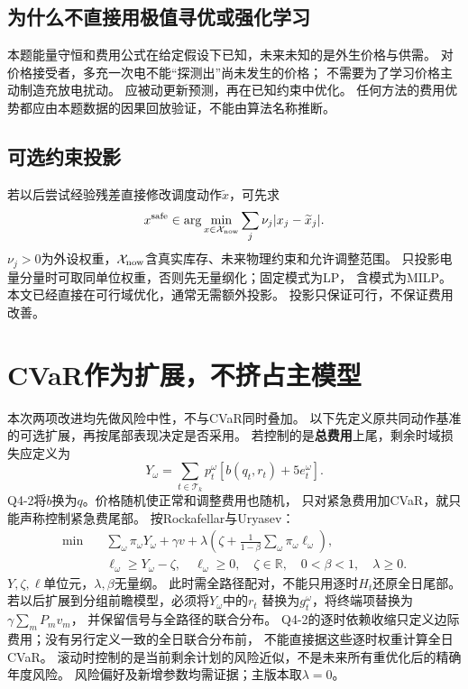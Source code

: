 \documentclass[UTF8,11pt]{ctexart}
\newcommand{\R}{\mathbb R}
\begin{document}
\subsection{为什么不直接用极值寻优或强化学习}
本题能量守恒和费用公式在给定假设下已知，未来未知的是外生价格与供需。
对价格接受者，多充一次电不能“探测出”尚未发生的价格；
不需要为了学习价格主动制造充放电扰动。
应被动更新预测，再在已知约束中优化。
任何方法的费用优势都应由本题数据的因果回放验证，不能由算法名称推断。

\subsection{可选约束投影}
若以后尝试经验残差直接修改调度动作$\widetilde x$，可先求
\begin{equation}
 x^{\rm safe}\in\arg\min_{x\in\mathcal X_{\rm now}}
                   \sum_j\nu_j|x_j-\widetilde x_j|.
\end{equation}
$\nu_j>0$为外设权重，$\mathcal X_{\rm now}$含真实库存、未来物理约束和允许调整范围。
只投影电量分量时可取同单位权重，否则先无量纲化；固定模式为LP，
含模式为MILP。本文已经直接在可行域优化，通常无需额外投影。
投影只保证可行，不保证费用改善。

\section{CVaR作为扩展，不挤占主模型}
本次两项改进均先做风险中性，不与CVaR同时叠加。
以下先定义原共同动作基准的可选扩展，再按尾部表现决定是否采用。
若控制的是\textbf{总费用}上尾，剩余时域损失应定义为
\begin{equation}
 Y_\omega=\sum_{t\in\mathcal T_k}p_t^\omega
                [b(q_t,r_t)+5e_t^\omega].
\end{equation}
Q4-2将$b$换为$q$。价格随机使正常和调整费用也随机，
只对紧急费用加CVaR，就只能声称控制紧急费尾部。
按Rockafellar与Uryasev\cite{rockafellar2000}：
\begin{align}
 \min\quad&\sum_\omega\pi_\omega Y_\omega+\gamma v+
  \lambda\left(\zeta+\frac{1}{1-\beta}\sum_\omega\pi_\omega\ell_\omega\right),\\
 &\ell_\omega\geq Y_\omega-\zeta,\quad\ell_\omega\geq0,\quad
 \zeta\in\R,\quad0<\beta<1,\quad\lambda\geq0.
\end{align}
$Y,\zeta,\ell$单位元，$\lambda,\beta$无量纲。
此时需全路径配对，不能只用逐时$H_t$还原全日尾部。
若以后扩展到分组前瞻模型，必须将$Y_\omega$中的$r_t$
替换为$g_t^\omega$，将终端项替换为$\gamma\sum_mP_mv_m$，
并保留信号与全路径的联合分布。
Q4-2的逐时依赖收缩只定义边际费用；没有另行定义一致的全日联合分布前，
不能直接据这些逐时权重计算全日CVaR。
滚动时控制的是当前剩余计划的风险近似，不是未来所有重优化后的精确年度风险。
风险偏好及新增参数均需证据；主版本取$\lambda=0$。
\end{document}
